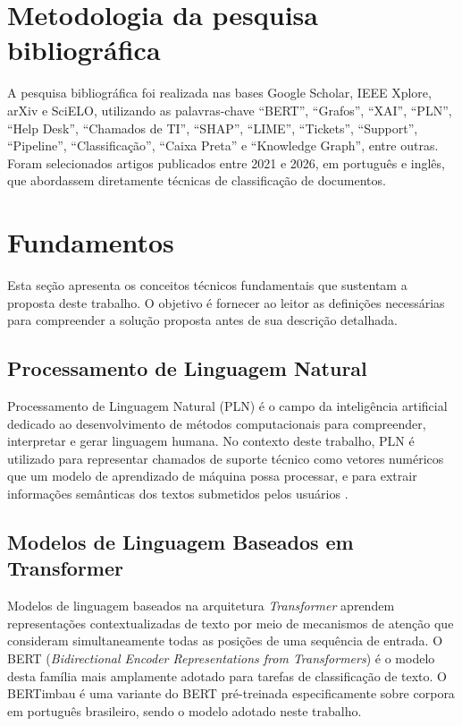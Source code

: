 \documentclass[
    12pt,                %
    openright,           %
    oneside,             %
    a4paper,             %
    english,             %
    brazil               %
]{abntex2}
\begin{document}
\section{Metodologia da pesquisa bibliográfica}
\label{sec:metodologia_pesquisa}

A pesquisa bibliográfica foi realizada nas bases Google Scholar, IEEE Xplore, arXiv e SciELO, utilizando as palavras-chave ``BERT'', ``Grafos'', ``XAI'', ``PLN'', ``Help Desk'', ``Chamados de TI'', ``SHAP'', ``LIME'', ``Tickets'', ``Support'', ``Pipeline'', ``Classificação'', ``Caixa Preta'' e ``Knowledge Graph'', entre outras. Foram selecionados artigos publicados entre 2021 e 2026, em português e inglês, que abordassem diretamente técnicas de classificação de documentos.

\section{Fundamentos}
\label{sec:fundamentos}
 
Esta seção apresenta os conceitos técnicos fundamentais que sustentam a proposta deste trabalho. O objetivo é fornecer ao leitor as definições necessárias para compreender a solução proposta antes de sua descrição detalhada.
 
\subsection{Processamento de Linguagem Natural}
 
Processamento de Linguagem Natural (PLN) é o campo da inteligência artificial dedicado ao desenvolvimento de métodos computacionais para compreender, interpretar e gerar linguagem humana. No contexto deste trabalho, PLN é utilizado para representar chamados de suporte técnico como vetores numéricos que um modelo de aprendizado de máquina possa processar, e para extrair informações semânticas dos textos submetidos pelos usuários \cite{devlin2019}.
 
\subsection{Modelos de Linguagem Baseados em Transformer}
 
Modelos de linguagem baseados na arquitetura \textit{Transformer} \cite{vaswani2017} aprendem representações contextualizadas de texto por meio de mecanismos de atenção que consideram simultaneamente todas as posições de uma sequência de entrada. O BERT (\textit{Bidirectional Encoder Representations from Transformers}) \cite{devlin2019} é o modelo desta família mais amplamente adotado para tarefas de classificação de texto. O BERTimbau \cite{souza2020} é uma variante do BERT pré-treinada especificamente sobre corpora em português brasileiro, sendo o modelo adotado neste trabalho.
 
\end{document}
